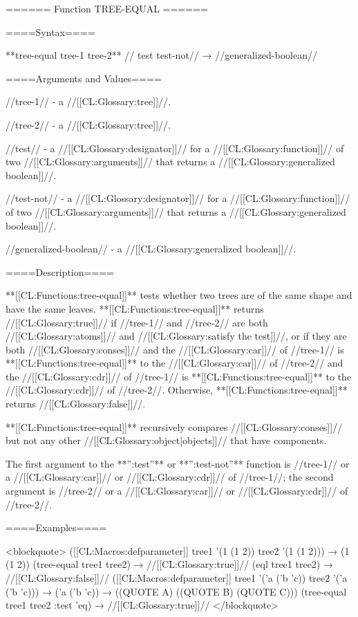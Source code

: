====== Function TREE-EQUAL ======

====Syntax====

**tree-equal {tree-1 tree-2** //\key} test test-not// → //generalized-boolean//

====Arguments and Values====

//tree-1// - a //[[CL:Glossary:tree]]//.

//tree-2// - a //[[CL:Glossary:tree]]//.

//test// - a //[[CL:Glossary:designator]]// for a //[[CL:Glossary:function]]// of two //[[CL:Glossary:arguments]]// that returns a //[[CL:Glossary:generalized boolean]]//.

//test-not// - a //[[CL:Glossary:designator]]// for a //[[CL:Glossary:function]]// of two //[[CL:Glossary:arguments]]// that returns a //[[CL:Glossary:generalized boolean]]//.

//generalized-boolean// - a //[[CL:Glossary:generalized boolean]]//.

====Description====

**[[CL:Functions:tree-equal]]** tests whether two trees are of the same shape and have the same leaves. **[[CL:Functions:tree-equal]]** returns //[[CL:Glossary:true]]// if //tree-1// and //tree-2// are both //[[CL:Glossary:atoms]]// and //[[CL:Glossary:satisfy the test]]//, or if they are both //[[CL:Glossary:conses]]// and the //[[CL:Glossary:car]]// of //tree-1// is **[[CL:Functions:tree-equal]]** to the //[[CL:Glossary:car]]// of //tree-2// and the //[[CL:Glossary:cdr]]// of //tree-1// is **[[CL:Functions:tree-equal]]** to the //[[CL:Glossary:cdr]]// of //tree-2//. Otherwise, **[[CL:Functions:tree-equal]]** returns //[[CL:Glossary:false]]//.

**[[CL:Functions:tree-equal]]** recursively compares //[[CL:Glossary:conses]]// but not any other //[[CL:Glossary:object|objects]]// that have components.

The first argument to the **'':test''** or **'':test-not''** function is //tree-1// or a //[[CL:Glossary:car]]// or //[[CL:Glossary:cdr]]// of //tree-1//; the second argument is //tree-2// or a //[[CL:Glossary:car]]// or //[[CL:Glossary:cdr]]// of //tree-2//.

====Examples====

<blockquote> ([[CL:Macros:defparameter]] tree1 '(1 (1 2)) tree2 '(1 (1 2))) → (1 (1 2)) (tree-equal tree1 tree2) → //[[CL:Glossary:true]]// (eql tree1 tree2) → //[[CL:Glossary:false]]// ([[CL:Macros:defparameter]] tree1 '('a ('b 'c)) tree2 '('a ('b 'c))) → ('a ('b 'c)) → ((QUOTE A) ((QUOTE B) (QUOTE C))) (tree-equal tree1 tree2 :test 'eq) → //[[CL:Glossary:true]]// </blockquote>

